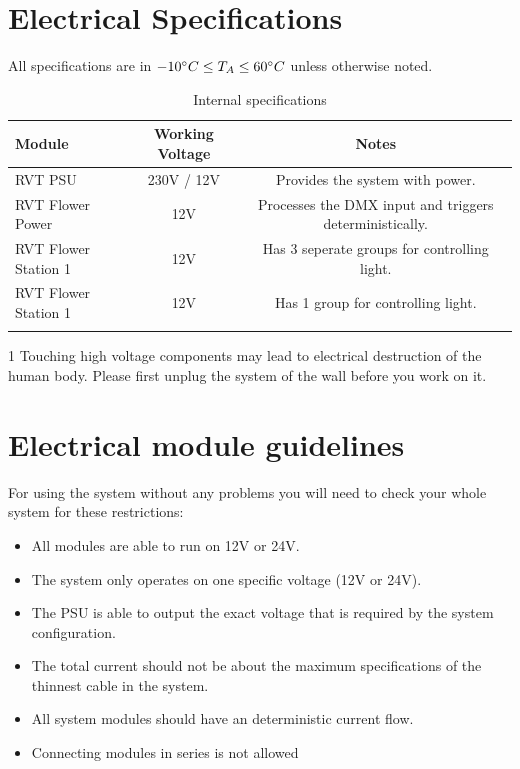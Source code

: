 \documentclass[10pt]{datasheet}
\begin{document}

\section{Electrical Specifications}
All specifications are in $-10\degree C \leq T_A \leq 60\degree C$ unless otherwise noted.

\begin{table}[h]
\begin{threeparttable}
\caption{Internal specifications}
\begin{tabularx}{\textwidth}{l | c | c}
    \thickhline
    \textbf{Module} & \textbf{Working Voltage} & \textbf{Notes} \\
    \hline
    RVT PSU  & 230V\tnote{1} / 12V & Provides the system with power.  \\
    RVT Flower Power & 12V & Processes the DMX input and triggers deterministically. \\
    RVT Flower Station 1 & 12V & Has 3 seperate groups for controlling light.  \\
    RVT Flower Station 1 & 12V & Has 1 group for controlling light.  \\
    \hline
    \thickhline
\end{tabularx}
\begin{tablenotes}
\item[1]{Touching high voltage components may lead to electrical destruction of the human body. Please first unplug the system of the wall before you work on it.}
\end{tablenotes}
\end{threeparttable}
\end{table}

\section{Electrical module guidelines}

For using the system without any problems you will need to check your whole system for these restrictions:
\begin{itemize}
\item{All modules are able to run on 12V or 24V.}
\item{The system only operates on one specific voltage (12V or 24V).}
\item{The PSU is able to output the exact voltage that is required by the system configuration.}
\item{The total current should not be about the maximum specifications of the thinnest cable in the system.}
\item{All system modules should have an deterministic current flow.}
\item{Connecting modules in series is not allowed}
\end{itemize}
\end{document}
